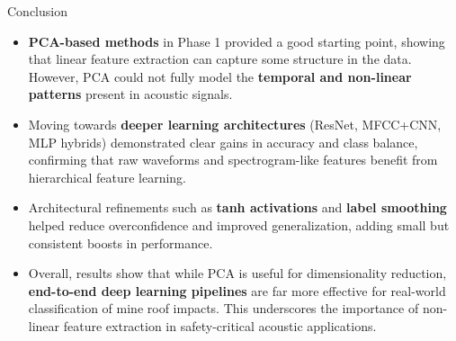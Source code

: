\documentclass{beamer}
\begin{document}
\begin{frame}{Conclusion}
\begin{itemize}
  \scriptsize
    \item \textbf{PCA-based methods} in Phase 1 provided a good starting point, showing that linear feature extraction can capture some structure in the data. However, PCA could not fully model the \textbf{temporal and non-linear patterns} present in acoustic signals.  
    \item Moving towards \textbf{deeper learning architectures} (ResNet, MFCC+CNN, MLP hybrids) demonstrated clear gains in accuracy and class balance, confirming that raw waveforms and spectrogram-like features benefit from hierarchical feature learning.  
    \item Architectural refinements such as \textbf{tanh activations} and \textbf{label smoothing} helped reduce overconfidence and improved generalization, adding small but consistent boosts in performance.  
    \item Overall, results show that while PCA is useful for dimensionality reduction, \textbf{end-to-end deep learning pipelines} are far more effective for real-world classification of mine roof impacts. This underscores the importance of non-linear feature extraction in safety-critical acoustic applications.  
\end{itemize}
\end{frame}
\end{document}
